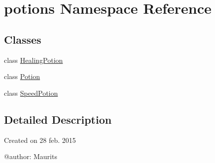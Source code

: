 \hypertarget{namespacepotions}{}\section{potions Namespace Reference}
\label{namespacepotions}
\subsection*{Classes}
\begin{DoxyCompactItemize}
\item 
class \hyperlink{classpotions_1_1_healing_potion}{Healing\+Potion}
\item 
class \hyperlink{classpotions_1_1_potion}{Potion}
\item 
class \hyperlink{classpotions_1_1_speed_potion}{Speed\+Potion}
\end{DoxyCompactItemize}


\subsection{Detailed Description}
\begin{DoxyVerb}Created on 28 feb. 2015

@author: Maurits
\end{DoxyVerb}
 